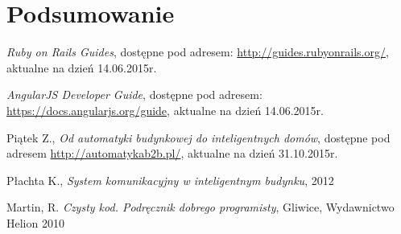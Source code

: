 \documentclass[eng,oneside]{mgr}
\begin{document}
\chapter{Podsumowanie}

\renewcommand\bibname{Literatura}
\begin{thebibliography}{inteligencja}
	
	\emph{Ruby on Rails Guides}, dostępne pod adresem: \url{http://guides.rubyonrails.org/},\\ aktualne na dzień 14.06.2015r.
	
	\emph{AngularJS Developer Guide}, dostępne pod adresem: \url{https://docs.angularjs.org/guide}, aktualne na dzień 14.06.2015r.

	Piątek Z., \emph{Od automatyki budynkowej do inteligentnych domów}, dostępne pod adresem \url{http://automatykab2b.pl/}, aktualne na dzień 31.10.2015r.

	Płachta K., \emph{System komunikacyjny w inteligentnym budynku}, 2012

	Martin, R. \emph{Czysty kod. Podręcznik dobrego programisty}, Gliwice, Wydawnictwo Helion 2010
	
\end{thebibliography}
\end{document}
